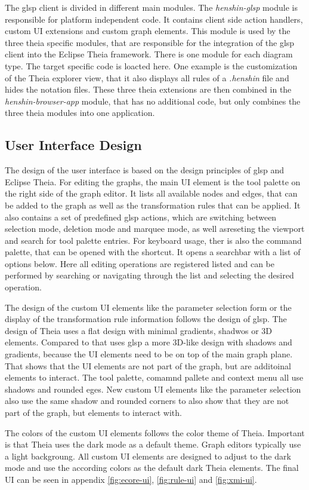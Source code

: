   The \ac{glsp} client is divided in different main modules.
  The \textit{henshin-glsp} module is responsible for platform independent code. It contains client side action handlers, custom UI extensions and custom graph elements. This module is used by the three theia specific modules, that are responsible for the integration of the \ac{glsp} client into the Eclipse Theia framework. There is one module for each diagram type. The target specific code is loacted here. One example is the customization of the Theia explorer view, that it also displays all rules of a \textit{.henshin} file and hides the notation files. These three theia extensions are then combined in the \textit{henshin-browser-app} module, that has no additional code, but only combines the three theia modules into one application. 

  \subsection{User Interface Design}
  \label{subsec:user-interface-design}

  The design of the user interface is based on the design principles of \ac{glsp} and Eclipse Theia. For editing the graphs, the main UI element is the tool palette on the right side of the graph editor. It lists all available nodes and edges, that can be added to the graph as well as the transformation rules that can be applied. It also contains a set of predefined \ac{glsp} actions, which are switching between selection mode, deletion mode and marquee mode, as well asreseting the viewport and search for tool palette entries. For keyboard usage, ther is also the command palette, that can be opened with the  shortcut. It opens a searchbar with a list of options below. Here all editing operations are registered listed and can be performed by searching or navigating through the list and selecting the desired operation. 
  
  The design of the custom UI elements like the parameter selection form or the display of the transformation rule information follows the design of \ac{glsp}. The design of Theia uses a flat design with minimal gradients, shadwos or 3D elements. Compared to that uses \ac{glsp} a more 3D-like design with shadows and gradients, because the UI elements need to be on top of the main graph plane. That shows that the UI elements are not part of the graph, but are additoinal elements to interact. The tool palette, comamnd pallete and context menu all use shadows and rounded eges. New custom UI elements like the parameter selection also use the same shadow and rounded corners to also show that they are not part of the graph, but elements to interact with.

  The colors of the custom UI elements follows the color theme of Theia. Important is that Theia uses the dark mode as a default theme. Graph editors typically use a light backgroung. All custom UI elements are designed to adjust to the dark mode and use the according colors as the default dark Theia elements. The final UI can be seen in appendix \ref{fig:ecore-ui}, \ref{fig:rule-ui} and \ref{fig:xmi-ui}.

